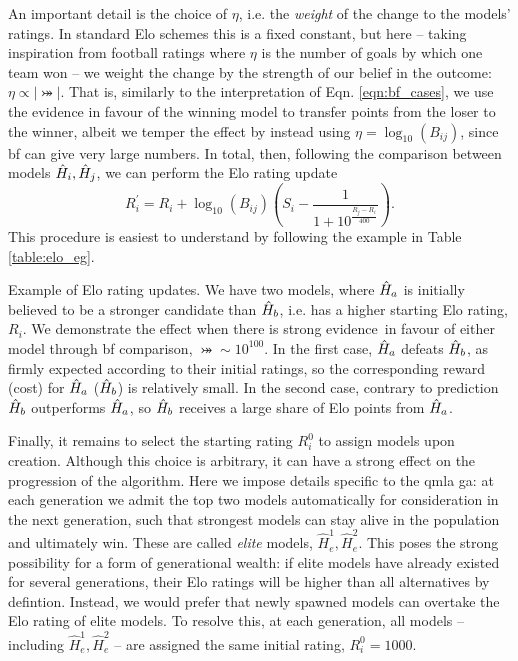 An important detail is the choice of $\eta$, i.e. the \emph{weight} of the 
    change to the models' ratings. 
In standard Elo schemes this is a fixed constant, 
    but here -- taking inspiration from football ratings where $\eta$ is the number of goals 
    by which one team won -- we weight the change by the strength of our belief in the outcome: 
    $\eta \propto \lvert \bij \rvert$.
That is, similarly to the interpretation of Eqn. \ref{eqn:bf_cases}, 
    we use the evidence in favour of the winning model to transfer points from the loser to the winner,
    albeit we temper the effect by instead using $\eta = \log_{10}(B_{ij})$, since \gls{bf} can give very large numbers. 
In total, then, following the comparison between models $\hat{H}_i, \hat{H}_j$, we can perform the Elo rating update
\begin{equation}
    \label{eqn:elo_update}
    R_i^{\prime} = R_i + \log_{10}(B_{ij}) \left(S_i - \frac{1}{1 + 10^{\frac{R_j - R_i}{400}}}\right).
\end{equation}
This procedure is easiest to understand by following the example in Table \ref{table:elo_eg}. 

\begin{table}
    \centering
    
    \caption[Example of Elo rating updates.]{
        Example of Elo rating updates. 
        We have two models, where $\hat{H}_a$ is initially believed to be a stronger candidate than $\hat{H}_b$, 
            i.e. has a higher starting Elo rating, $R_i$.     
        We demonstrate the effect when there is strong evidence\footnotemark \ in favour of either model through \gls{bf} comparison, $\bij \sim 10^{100}$. 
        In the first case, $\hat{H}_a$ defeats $\hat{H}_b$, as firmly expected according to their initial ratings,
            so the corresponding reward (cost) for $\hat{H}_a$ ($\hat{H}_b$) is relatively small.
        In the second case, contrary to prediction $\hat{H}_b$ outperforms $\hat{H}_a$, 
            so $\hat{H}_b$ receives a large share of Elo points from $\hat{H}_a$. 
    }
    \label{table:elo_eg}
\end{table}


\par 
Finally, it remains to select the starting rating $R_i^0$ to assign models upon creation. 
Although this choice is arbitrary, it can have a strong effect on the progression of the algorithm. 
Here we impose details specific to the \gls{qmla} \gls{ga}: 
    at each generation we admit the top two  models automatically 
    for consideration in the next generation, 
    such that strongest models can stay alive in the population and ultimately win. 
These are called \emph{elite} models, $\hat{H}_e^1, \hat{H}_e^2$. 
This poses the strong possibility for a form of generational wealth:
    if elite models have already existed for several generations, 
    their Elo ratings will be higher than all alternatives by defintion. 
Instead, we would prefer that newly spawned models can overtake the Elo rating of elite models. 
To resolve this, at each generation, all models -- including $\hat{H}_e^1, \hat{H}_e^2$ -- 
    are assigned the same initial rating, $R_i^0=1000$. 

